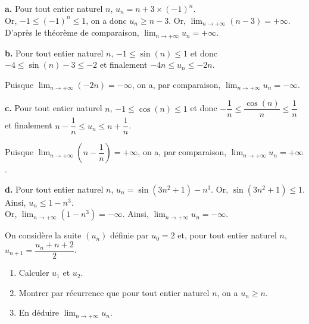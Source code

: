 \documentclass[11pt,fleqn, openany]{book} %
\begin{document}
\begin{solution}\textbf{a.} Pour tout entier naturel $n$, $u_n=n+3\times (-1)^n$.\\ Or, $-1 \leqslant (-1)^n \leqslant 1$, on a donc $u_n \geqslant n-3$. Or, $\displaystyle \lim_{n\to + \infty}(n-3) = +\infty$. D'après le théorème de comparaison, $\displaystyle \lim_{n\to + \infty} u_n = +\infty$.

\textbf{b.} Pour tout entier naturel $n$, $-1 \leqslant \sin(n) \leqslant 1$ et donc $-4 \leqslant \sin(n)-3 \leqslant -2$ et finalement $-4n \leqslant u_n \leqslant -2n$.

Puisque $\displaystyle\lim_{n \to + \infty} (-2n)=-\infty$, on a, par comparaison, $\displaystyle\lim_{n \to + \infty}u_n=-\infty$.

\textbf{c.} Pour tout entier naturel $n$, $-1 \leqslant \cos(n) \leqslant 1$ et donc $-\dfrac{1}{n} \leqslant \dfrac{\cos(n)}{n} \leqslant \dfrac{1}{n}$ et finalement $n-\dfrac{1}{n} \leqslant u_n \leqslant n+\dfrac{1}{n}$.

Puisque $\displaystyle\lim_{n \to + \infty} \left(n-\dfrac{1}{n}\right)=+\infty$, on a, par comparaison, $\displaystyle\lim_{n \to + \infty}u_n=+\infty$.

\textbf{d.} Pour tout entier naturel $n$, $u_n=\sin (3n^2+1)-n^3$. Or, $\sin (3n^2+1) \leqslant 1$. Ainsi, $u_n \leqslant 1-n^3$. \\Or, $\displaystyle \lim_{n \to +\infty} (1-n^3)=-\infty$. Ainsi, $\displaystyle \lim_{n \to +\infty} u_n = -\infty$.

\end{solution}


\begin{exercise}[topic=lim11]On considère la suite $(u_n)$ définie par $u_0=2$ et, pour tout entier naturel $n$, $u_{n+1}=\dfrac{u_n+n+2}{2}$.
\begin{enumerate}
\item Calculer $u_1$ et $u_2$.
\item Montrer par récurrence que pour tout entier naturel $n$, on a $u_n\geqslant n$.
\item En déduire $\displaystyle\lim_{n \to +\infty}u_n$.
\end{enumerate}\end{exercise}
\end{document}
